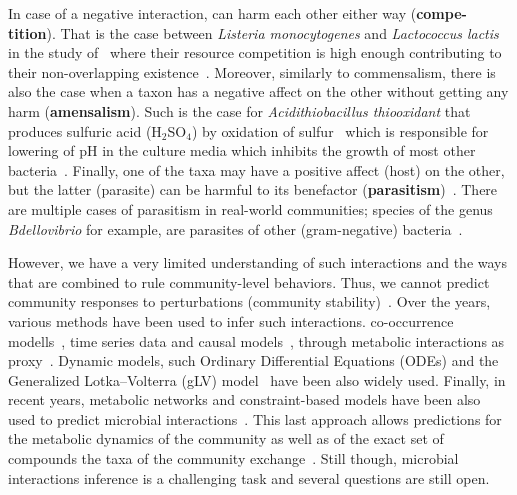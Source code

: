       In case of a negative interaction, can harm each other either way (\textbf{compe-tition}). 
      That is the case between 
      \textit{Listeria monocytogenes} and \textit{Lactococcus lactis} in the study of~\citeauthor{freilich2010large} where their resource competition is high enough
      contributing to their non-overlapping existence~\cite{freilich2010large}.
      Moreover, similarly to commensalism, 
      there is also the case when a taxon has a negative affect on the other
      without getting any harm (\textbf{amensalism}). 
      Such is the case for \textit{Acidithiobacillus thiooxidant} that produces
      sulfuric acid (H$_2$SO$_4$) by oxidation of sulfur~\cite{bobadilla2013stoichiometric} which is responsible for lowering of pH in the culture media which inhibits the growth of most other bacteria~\cite{jin2018ph}.
      Finally, one of the taxa may have a positive affect (host) on the other, but the 
      latter (parasite) can be harmful to its benefactor (\textbf{parasitism})~\cite{faust2012microbial}. 
      There are multiple cases of parasitism in real-world communities; 
      species of the genus \textit{Bdellovibrio} for example, are parasites of other (gram-negative) bacteria~\cite{stolp1979interactions}.

      However, we have a very limited understanding
      of such interactions and the ways that are combined to
      rule community-level behaviors. 
      Thus, we cannot predict community responses to
      perturbations (community stability)~\cite{venturelli2018deciphering}.
      Over the years, various methods have been used to infer such interactions. 
      co-occurrence modells~\cite{faust2012microbial},
      time series data and causal models~\cite{mainali2019detecting},
      through metabolic interactions as proxy~\cite{levy2012reverse}.
      Dynamic models, such Ordinary Differential Equations (ODEs)
      and the Generalized Lotka–Volterra (gLV) model~\cite{gonze2018microbial}
      have been also widely used. 
      Finally, in recent years, 
      metabolic networks and constraint-based models have been also used
      to predict microbial interactions~\cite{heinken2021advances, dukovski2021metabolic}.
      This last approach allows predictions for the metabolic dynamics of the community 
      as well as of the exact set of compounds the taxa of the community exchange~\cite{levy2012reverse}.
      Still though, microbial interactions inference is a challenging task 
      and several questions are still open. 
      
